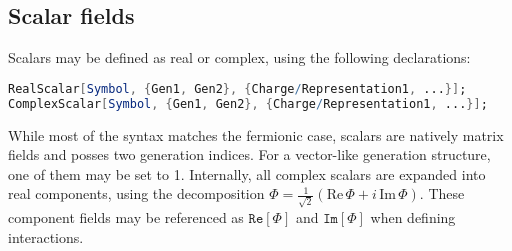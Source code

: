\documentclass{scrartcl}
\begin{document}
\subsection{Scalar fields}
Scalars may be defined as real or complex, using the following declarations:
\begin{lstlisting}[language=mathematica,mathescape,columns=flexible,backgroundcolor=\color{light-gray}]
RealScalar[Symbol, {Gen1, Gen2}, {Charge/Representation1, ...}];
ComplexScalar[Symbol, {Gen1, Gen2}, {Charge/Representation1, ...}];
\end{lstlisting}
While most of the syntax matches the fermionic case, scalars are natively matrix fields and posses two generation indices. For a vector-like generation structure, one of them may be set to 1.\newline
Internally, all complex scalars are expanded into real components, using the decomposition $\Phi = \frac{1}{\sqrt{2}} \left(\mathrm{Re} \, \Phi + i \, \mathrm{Im} \,\Phi\right)$. These component fields may be referenced as $\mathtt{Re[\Phi]}$ and $\mathtt{Im[\Phi]}$ when defining interactions.
\end{document}
